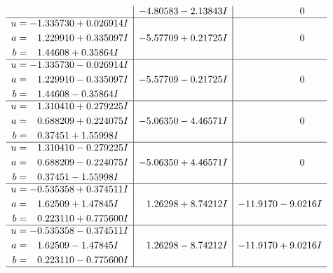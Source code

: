\documentclass[1p]{elsarticle_modified}
\theoremstyle{definition}
\begin{document}
$$\begin{array}{c|c|c}
 & -4.80583 - 2.13843 I & \phantom{-0.000000 } 0 \\ \hline\begin{aligned}
u &= -1.335730 + 0.026914 I \\
a &= \phantom{-}1.229910 + 0.335097 I \\
b &= \phantom{-}1.44608 + 0.35864 I\end{aligned}
 & -5.57709 + 0.21725 I & \phantom{-0.000000 } 0 \\ \hline\begin{aligned}
u &= -1.335730 - 0.026914 I \\
a &= \phantom{-}1.229910 - 0.335097 I \\
b &= \phantom{-}1.44608 - 0.35864 I\end{aligned}
 & -5.57709 - 0.21725 I & \phantom{-0.000000 } 0 \\ \hline\begin{aligned}
u &= \phantom{-}1.310410 + 0.279225 I \\
a &= \phantom{-}0.688209 + 0.224075 I \\
b &= \phantom{-}0.37451 + 1.55998 I\end{aligned}
 & -5.06350 - 4.46571 I & \phantom{-0.000000 } 0 \\ \hline\begin{aligned}
u &= \phantom{-}1.310410 - 0.279225 I \\
a &= \phantom{-}0.688209 - 0.224075 I \\
b &= \phantom{-}0.37451 - 1.55998 I\end{aligned}
 & -5.06350 + 4.46571 I & \phantom{-0.000000 } 0 \\ \hline\begin{aligned}
u &= -0.535358 + 0.374511 I \\
a &= \phantom{-}1.62509 + 1.47845 I \\
b &= \phantom{-}0.223110 + 0.775600 I\end{aligned}
 & \phantom{-}1.26298 + 8.74212 I & -11.9170 - 9.0216 I \\ \hline\begin{aligned}
u &= -0.535358 - 0.374511 I \\
a &= \phantom{-}1.62509 - 1.47845 I \\
b &= \phantom{-}0.223110 - 0.775600 I\end{aligned}
 & \phantom{-}1.26298 - 8.74212 I & -11.9170 + 9.0216 I\\
 \hline 
 \end{array}$$\newpage$$\begin{array}{c|c|c}  

\end{array}$$
\end{document}
